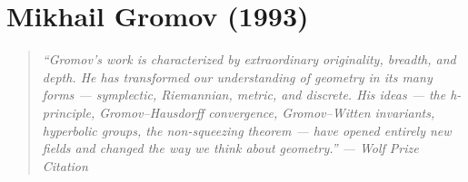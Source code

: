 \let\R\relax
\newcommand{\R}{\mathbb{R}}
\let\C\relax
\newcommand{\C}{\mathbb{C}}
\let\N\relax
\newcommand{\N}{\mathbb{N}}
\let\Z\relax
\newcommand{\Z}{\mathbb{Z}}
\let\Q\relax
\newcommand{\Q}{\mathbb{Q}}
\let\SO\relax
\newcommand{\SO}{\operatorname{SO}}
\let\SL\relax
\newcommand{\SL}{\operatorname{SL}}
\let\GL\relax
\newcommand{\GL}{\operatorname{GL}}
\let\St\relax
\newcommand{\St}{\operatorname{St}}
\let\GV\relax
\newcommand{\GV}{\operatorname{GV}}
\let\E\relax
\newcommand{\E}{\operatorname{E}}
\let\vol\relax
\newcommand{\vol}{\operatorname{vol}}
\let\diam\relax
\newcommand{\diam}{\operatorname{diam}}
\let\inj\relax
\newcommand{\inj}{\operatorname{inj}}
\let\supp\relax
\newcommand{\supp}{\operatorname{supp}}
\let\dist\relax
\newcommand{\dist}{\operatorname{dist}}
\let\Aut\relax
\newcommand{\Aut}{\operatorname{Aut}}
\let\End\relax
\newcommand{\End}{\operatorname{End}}
\let\Hom\relax
\newcommand{\Hom}{\operatorname{Hom}}
\let\Ker\relax
\newcommand{\Ker}{\operatorname{Ker}}
\let\im\relax
\newcommand{\im}{\operatorname{im}}
\let\Symp\relax
\newcommand{\Symp}{\operatorname{Symp}}
\let\Ham\relax
\newcommand{\Ham}{\operatorname{Ham}}
\let\Crit\relax
\newcommand{\Crit}{\operatorname{Crit}}
\let\Mod\relax
\newcommand{\Mod}{\operatorname{Mod}}
\let\Hol\relax
\newcommand{\Hol}{\operatorname{Hol}}
\let\Area\relax
\newcommand{\Area}{\operatorname{Area}}
\let\Ric\relax
\newcommand{\Ric}{\operatorname{Ric}}
\let\Sec\relax
\newcommand{\Sec}{\operatorname{Sec}}
\let\Isom\relax
\newcommand{\Isom}{\operatorname{Isom}}
\let\Cay\relax
\newcommand{\Cay}{\operatorname{Cay}}
\let\codim\relax
\newcommand{\codim}{\operatorname{codim}}
\let\gr\relax
\newcommand{\gr}{\operatorname{gr}}
\let\id\relax
\newcommand{\id}{\operatorname{id}}
\let\const\relax
\newcommand{\const}{\operatorname{const}}
\let\FillRad\relax
\newcommand{\FillRad}{\operatorname{FillRad}}
\let\sys\relax
\newcommand{\sys}{\operatorname{sys}}

\chapter{Mikhail Gromov (1993)}

\begin{quote}
\it ``Gromov's work is characterized by extraordinary originality, breadth, and depth. He has transformed our understanding of geometry in its many forms --- symplectic, Riemannian, metric, and discrete. His ideas --- the h-principle, Gromov--Hausdorff convergence, Gromov--Witten invariants, hyperbolic groups, the non-squeezing theorem --- have opened entirely new fields and changed the way we think about geometry.'' --- Wolf Prize Citation
\end{quote}

